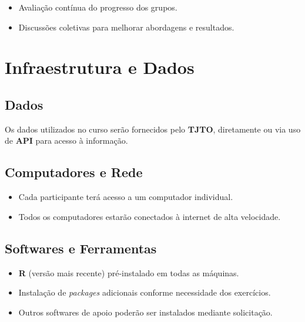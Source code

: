\documentclass[
  letterpaper,
  DIV=11,
  numbers=noendperiod]{scrreprt}
\providecommand{\tightlist}{%
  \setlength{\itemsep}{0pt}\setlength{\parskip}{0pt}}
\begin{document}
\begin{itemize}
\tightlist
\item
  Avaliação contínua do progresso dos grupos.\\
\item
  Discussões coletivas para melhorar abordagens e resultados.
\end{itemize}

\section{Infraestrutura e Dados}\label{infraestrutura-e-dados}

\subsection{Dados}\label{dados}

Os dados utilizados no curso serão fornecidos pelo \textbf{TJTO},
diretamente ou via uso de \textbf{API} para acesso à informação.

\subsection{Computadores e Rede}\label{computadores-e-rede}

\begin{itemize}
\tightlist
\item
  Cada participante terá acesso a um computador individual.\\
\item
  Todos os computadores estarão conectados à internet de alta
  velocidade.
\end{itemize}

\subsection{Softwares e Ferramentas}\label{softwares-e-ferramentas}

\begin{itemize}
\tightlist
\item
  \textbf{R} (versão mais recente) pré-instalado em todas as máquinas.\\
\item
  Instalação de \emph{packages} adicionais conforme necessidade dos
  exercícios.\\
\item
  Outros softwares de apoio poderão ser instalados mediante solicitação.
\end{itemize}
\end{document}
